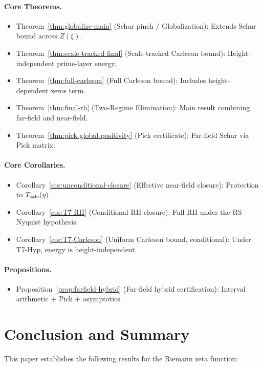 \documentclass[11pt]{article}
\theoremstyle{definition}
\theoremstyle{remark}
\theoremstyle{definition}
\begin{document}
\paragraph{Core Theorems.}
\begin{itemize}
\item Theorem~\ref{thm:globalize-main} (Schur pinch / Globalization): Extends Schur bound across $Z(\xi)$.
\item Theorem~\ref{thm:scale-tracked-final} (Scale-tracked Carleson bound): Height-independent prime-layer energy.
\item Theorem~\ref{thm:full-carleson} (Full Carleson bound): Includes height-dependent zeros term.
\item Theorem~\ref{thm:final-rh} (Two-Regime Elimination): Main result combining far-field and near-field.
\item Theorem~\ref{thm:pick-global-positivity} (Pick certificate): Far-field Schur via Pick matrix.
\end{itemize}

\paragraph{Core Corollaries.}
\begin{itemize}
\item Corollary~\ref{cor:unconditional-closure} (Effective near-field closure): Protection to $T_{\rm safe}(\eta)$.
\item Corollary~\ref{cor:T7-RH} (Conditional RH closure): Full RH under the RS Nyquist hypothesis.
\item Corollary~\ref{cor:T7-Carleson} (Uniform Carleson bound, conditional): Under T7-Hyp, energy is height-independent.
\end{itemize}

\paragraph{Propositions.}
\begin{itemize}
\item Proposition~\ref{prop:farfield-hybrid} (Far-field hybrid certification): Interval arithmetic + Pick + asymptotics.
\end{itemize}

\section*{Conclusion and Summary}

This paper establishes the following results for the Riemann zeta function:
\end{document}
